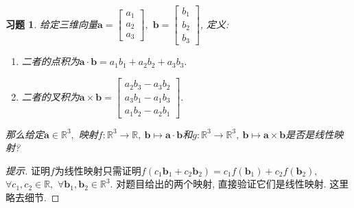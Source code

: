 \documentclass[UTF8]{ctexart}
\newcommand\bs[1]{\boldsymbol{ #1}}
\newtheorem{ex}[thm]{习题}
\begin{document}
\begin{ex}
给定三维向量$\bs a = \begin{bmatrix}
				a_1 \\ a_2 \\ a_3
			\end{bmatrix},$ $\bs b = \begin{bmatrix}
				b_1 \\ b_2 \\ b_3
			\end{bmatrix}$, 定义:

\begin{enumerate}
\item 二者的点积为$\bs a \cdot \bs b = a_1 b_1 + a_2 b_2 + a_3 b_3.$

\item 二者的叉积为$\bs a \times \bs b = \begin{bmatrix}
				a_2b_3 - a_3 b_2 \\ a_3b_1 - a_1 b_3 \\ a_1 b_2 - a_2b_1
			\end{bmatrix}.$
\end{enumerate}
那么给定$\bs a \in \mathbb{R}^3,$ 映射$f : \mathbb{R}^3 \to \mathbb{R}, ~ \bs b \mapsto \bs a\cdot \bs b$和$g: \mathbb{R}^3 \to \mathbb{R}^3,~ \bs b\mapsto \bs a\times \bs b$是否是线性映射?
\end{ex}
\begin{proof}[提示]
证明$f$为线性映射只需证明$f(c_1 \bs b_1 + c_2 \bs b_2) = c_1 f(\bs b_1) + c_2 f(\bs b_2),$ $\forall c_1, c_2 \in \mathbb{R},$ $\forall \bs b_1, \bs b_2 \in \mathbb{R}^3.$ 对题目给出的两个映射, 直接验证它们是线性映射. 这里略去细节.
\end{proof}
\end{document}
